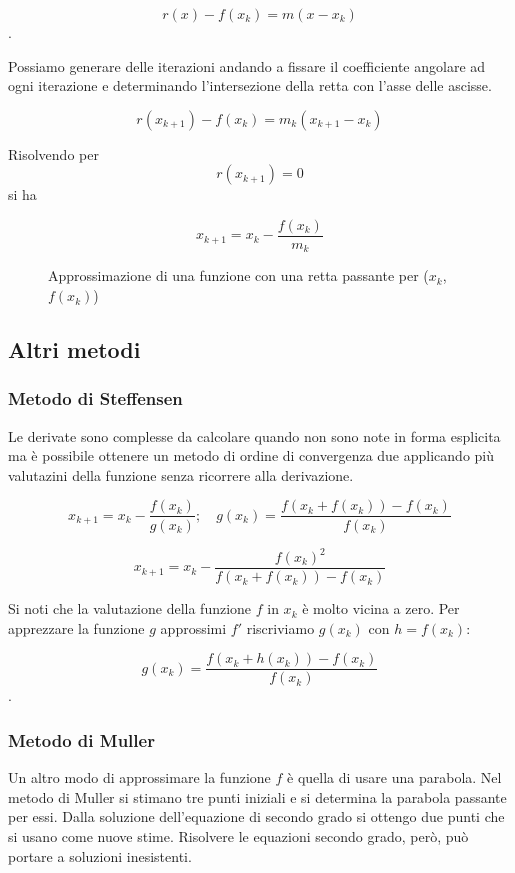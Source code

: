 \documentclass[12pt]{article}
\theoremstyle{plain}%
\theoremstyle{definition}
\theoremstyle{remark}
\begin{document}
$$r(x) - f(x_k) = m (x - x_k)$$.

Possiamo generare delle iterazioni andando a fissare il coefficiente angolare ad ogni iterazione e determinando l'intersezione della retta con l'asse delle ascisse.

$$r(x_{k+1}) - f(x_k) = m_k (x_{k+1} - x_k)$$

Risolvendo per $$r(x_{k+1}) = 0$$ si ha

\begin{equation}
    x_{k+1} = x_k - \frac{f(x_k)}{m_k}
\end{equation}

\begin{figure}
    \begin{center}
        
        \caption{Approssimazione di una funzione con una retta passante per ($x_k$, $f(x_k)$)}
        \label{fig:retta_approx}
    \end{center}
\end{figure}







\subsection{Altri metodi}

\subsubsection{Metodo di Steffensen}

Le derivate sono complesse da calcolare quando non sono
note in forma esplicita ma è possibile ottenere un metodo
di ordine di convergenza due applicando più valutazini della funzione
senza ricorrere alla derivazione.

$$x_{k+1} = x_k -\frac{f(x_k)}{g(x_k)};\quad g(x_k) =\frac{f(x_k + f(x_k )) - f(x_k )}{f(x_k)}$$

$$x_{k+1} = x_k - \frac{f(x_k)^2}{f(x_k + f(x_k )) - f(x_k )}$$

Si noti che la valutazione della funzione $f$ in $x_k$ è molto vicina a zero.
Per apprezzare la funzione $g$ approssimi $f'$ riscriviamo $g(x_k)$ con
$h = f(x_k)$:

$$g(x_k) =\frac{f(x_k + h(x_k )) - f(x_k )}{f(x_k)}$$.

\subsubsection{Metodo di Muller}

Un altro modo di approssimare la funzione $f$ è quella di usare una parabola.
Nel metodo di Muller si stimano tre punti iniziali e si determina la parabola
passante per essi. Dalla soluzione dell'equazione di secondo grado si ottengo
due punti che si usano come nuove stime.
Risolvere le equazioni secondo grado, però, può portare a soluzioni inesistenti.
\end{document}
